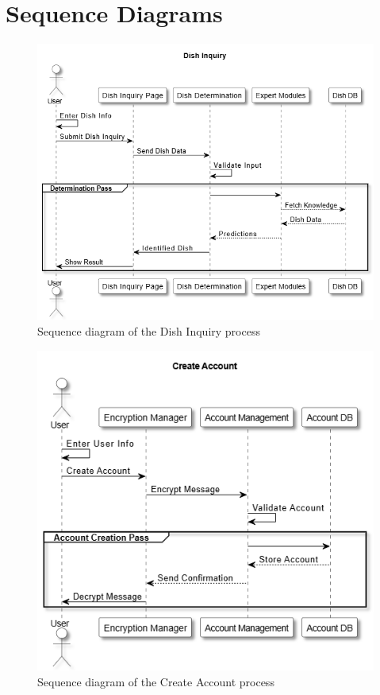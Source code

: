 \documentclass[]{article}
\begin{document}

\section{Sequence Diagrams}
\label{sec:sequence_diagrams}
\begin{figure}[H]
	\centering
	\includegraphics[width=\textwidth]{image/D3_sequence_diagrams/dish_inquiry.png}
	\caption{Sequence diagram of the Dish Inquiry process}
	\label{fig:dish_inquiry_sequence}
\end{figure}


\begin{figure}[H]
	\centering
	\includegraphics[width=\textwidth]{image/D3_sequence_diagrams/create_account.png}
	\caption{Sequence diagram of the Create Account process}
	\label{fig:create_account_sequence}
\end{figure}
\end{document}
